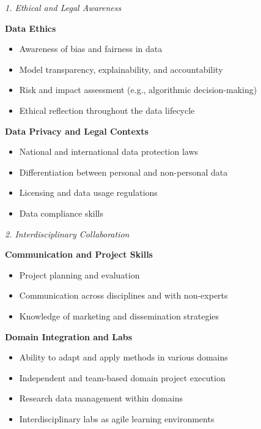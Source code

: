 \documentclass[
        english,biblatex
    ]{lni}
\providecommand{\tightlist}{%
    \setlength{\itemsep}{0pt}\setlength{\parskip}{0pt}}
\begin{document}
    \emph{1. Ethical and Legal Awareness}

    \textbf{Data Ethics}

    \begin{itemize}
    \tightlist
    \item
      Awareness of bias and fairness in data
    \item
      Model transparency, explainability, and accountability
    \item
      Risk and impact assessment (e.g., algorithmic decision-making)
    \item
      Ethical reflection throughout the data lifecycle
    \end{itemize}

    \textbf{Data Privacy and Legal Contexts}

    \begin{itemize}
    \tightlist
    \item
      National and international data protection laws
    \item
      Differentiation between personal and non-personal data
    \item
      Licensing and data usage regulations
    \item
      Data compliance skills
    \end{itemize}

    \emph{2. Interdisciplinary Collaboration}

    \textbf{Communication and Project Skills}

    \begin{itemize}
    \tightlist
    \item
      Project planning and evaluation
    \item
      Communication across disciplines and with non-experts
    \item
      Knowledge of marketing and dissemination strategies
    \end{itemize}

    \textbf{Domain Integration and Labs}

    \begin{itemize}
    \tightlist
    \item
      Ability to adapt and apply methods in various domains
    \item
      Independent and team-based domain project execution
    \item
      Research data management within domains
    \item
      Interdisciplinary labs as agile learning environments
    \end{itemize}
\end{document}

